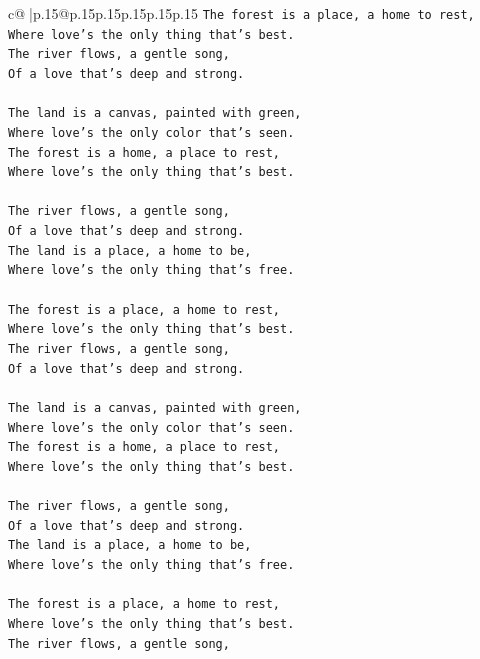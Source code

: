 \documentclass{article}
\begin{document}
{\begin{supertabular}{c@{$\;$}|p{.15\linewidth}@{}p{.15\linewidth}p{.15\linewidth}p{.15\linewidth}p{.15\linewidth}p{.15\linewidth}}
{{{\texttt{The forest is a place, a home to rest,} \\
\texttt{Where love's the only thing that's best.} \\
\texttt{The river flows, a gentle song,} \\
\texttt{Of a love that's deep and strong.} \\
\\ 
\texttt{The land is a canvas, painted with green,} \\
\texttt{Where love's the only color that's seen.} \\
\texttt{The forest is a home, a place to rest,} \\
\texttt{Where love's the only thing that's best.} \\
\\ 
\texttt{The river flows, a gentle song,} \\
\texttt{Of a love that's deep and strong.} \\
\texttt{The land is a place, a home to be,} \\
\texttt{Where love's the only thing that's free.} \\
\\ 
\texttt{The forest is a place, a home to rest,} \\
\texttt{Where love's the only thing that's best.} \\
\texttt{The river flows, a gentle song,} \\
\texttt{Of a love that's deep and strong.} \\
\\ 
\texttt{The land is a canvas, painted with green,} \\
\texttt{Where love's the only color that's seen.} \\
\texttt{The forest is a home, a place to rest,} \\
\texttt{Where love's the only thing that's best.} \\
\\ 
\texttt{The river flows, a gentle song,} \\
\texttt{Of a love that's deep and strong.} \\
\texttt{The land is a place, a home to be,} \\
\texttt{Where love's the only thing that's free.} \\
\\ 
\texttt{The forest is a place, a home to rest,} \\
\texttt{Where love's the only thing that's best.} \\
\texttt{The river flows, a gentle song,} \\
}}}
\end{supertabular}}
\end{document}
